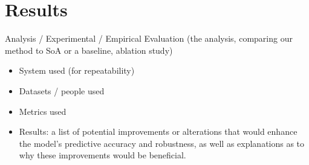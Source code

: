 \section{Results}\label{sec:results}
Analysis / Experimental / Empirical Evaluation (the analysis, comparing our method to SoA or a baseline, ablation study)
\begin{itemize}
    \item System used (for repeatability)
    \item Datasets / people used
    \item Metrics used
    \item Results: a list of potential improvements or alterations that would enhance the model's predictive accuracy and robustness, as well as explanations as to why these improvements would be beneficial.
\end{itemize}

